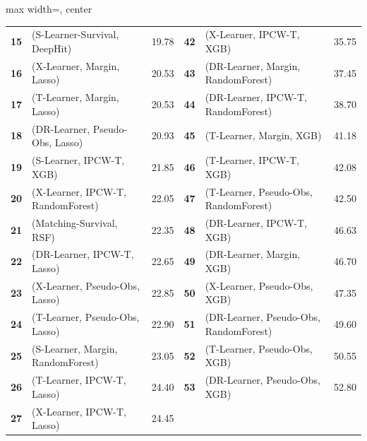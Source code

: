 \begin{table}[htbp]
{\begin{adjustbox}{max width=\textwidth, center}
\begin{tabular}{rlr@{\hskip 24pt}rlr}
\textbf{15} & (S-Learner-Survival, DeepHit) & 19.78 & \textbf{42} & (X-Learner, IPCW-T, XGB) & 35.75 \\
\textbf{16} & (X-Learner, Margin, Lasso) & 20.53 & \textbf{43} & (DR-Learner, Margin, RandomForest) & 37.45 \\
\textbf{17} & (T-Learner, Margin, Lasso) & 20.53 & \textbf{44} & (DR-Learner, IPCW-T, RandomForest) & 38.70 \\
\textbf{18} & (DR-Learner, Pseudo-Obs, Lasso) & 20.93 & \textbf{45} & (T-Learner, Margin, XGB) & 41.18 \\
\textbf{19} & (S-Learner, IPCW-T, XGB) & 21.85 & \textbf{46} & (T-Learner, IPCW-T, XGB) & 42.08 \\
\textbf{20} & (X-Learner, IPCW-T, RandomForest) & 22.05 & \textbf{47} & (T-Learner, Pseudo-Obs, RandomForest) & 42.50 \\
\textbf{21} & (Matching-Survival, RSF) & 22.35 & \textbf{48} & (DR-Learner, IPCW-T, XGB) & 46.63 \\
\textbf{22} & (DR-Learner, IPCW-T, Lasso) & 22.65 & \textbf{49} & (DR-Learner, Margin, XGB) & 46.70 \\
\textbf{23} & (X-Learner, Pseudo-Obs, Lasso) & 22.85 & \textbf{50} & (X-Learner, Pseudo-Obs, XGB) & 47.35 \\
\textbf{24} & (T-Learner, Pseudo-Obs, Lasso) & 22.90 & \textbf{51} & (DR-Learner, Pseudo-Obs, RandomForest) & 49.60 \\
\textbf{25} & (S-Learner, Margin, RandomForest) & 23.05 & \textbf{52} & (T-Learner, Pseudo-Obs, XGB) & 50.55 \\
\textbf{26} & (T-Learner, IPCW-T, Lasso) & 24.40 & \textbf{53} & (DR-Learner, Pseudo-Obs, XGB) & 52.80 \\
\textbf{27} & (X-Learner, IPCW-T, Lasso) & 24.45 &  &  &  \\
\bottomrule
\end{tabular}
\end{adjustbox}
}
\end{table}